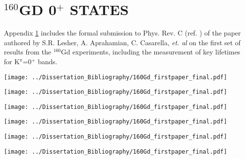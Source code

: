 \chapter{$^{160}$GD 0$^+$ STATES}\label{appendix:160Gd_pos}

Appendix \ref{appendix:160Gd_pos} includes the formal submission to Phys. Rev. C (ref. \cite{Lesher_160Gd0s}) of the paper authored by S.R. Lesher, A. Aprahamian, C. Casarella, \textit{et. al} on the first set of results from the $^{160}$Gd experiments, including the measurement of key lifetimes for K$^\pi$=0$^+$ bands.
\newpage

\begin{center}
\texttt{[image: ../Dissertation\_Bibliography/160Gd\_firstpaper\_final.pdf]}
\end{center}

\begin{center}
\texttt{[image: ../Dissertation\_Bibliography/160Gd\_firstpaper\_final.pdf]}
\end{center}

\begin{center}
\texttt{[image: ../Dissertation\_Bibliography/160Gd\_firstpaper\_final.pdf]}
\end{center}

\begin{center}
\texttt{[image: ../Dissertation\_Bibliography/160Gd\_firstpaper\_final.pdf]}
\end{center}

\begin{center}
\texttt{[image: ../Dissertation\_Bibliography/160Gd\_firstpaper\_final.pdf]}
\end{center}

\begin{center}
\texttt{[image: ../Dissertation\_Bibliography/160Gd\_firstpaper\_final.pdf]}
\end{center}